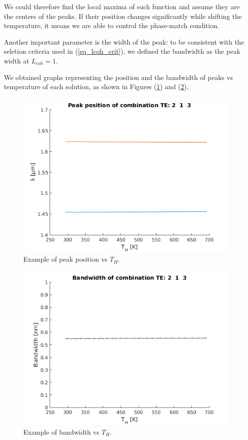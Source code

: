 \documentclass[12pt,a4paper,twoside]{article}
\begin{document}
We could therefore find the local maxima of such function and assume they are the centers of the peaks.
If their position changes significantly while shifting the temperature, it means we are able to control the phase-match condition.

Another important parameter is the width of the peak: to be consistent with the seletion criteria used in (\ref{eq_lcoh_crit}), we defined the bandwidth as the peak width at $L_{coh} = 1$.

We obtained graphs representing the position and the bandwidth of peaks vs temperature of each solution, as shown in Figures (\ref{fig_example_position}) and (\ref{fig_example_bandwidth}).

\begin{figure}%
	\centering
	\includegraphics[width=.64\textwidth]{ex_pos.png}
	\caption{Example of peak position vs $T_H$.}
	\label{fig_example_position}
\end{figure}
\begin{figure}%
	\centering
	\includegraphics[width=.64\textwidth]{ex_bw.png}
	\caption{Example of bandwidth vs $T_H$.}
	\label{fig_example_bandwidth}
\end{figure}
\end{document}

